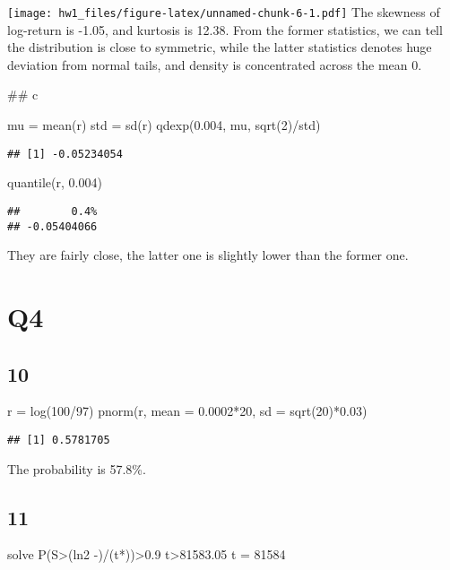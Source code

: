 \documentclass[
]{article}
\newenvironment{Shaded}{\begin{snugshade}}{\end{snugshade}}
\newcommand{\AttributeTok}[1]{\textcolor[rgb]{0.77,0.63,0.00}{#1}}
\newcommand{\DecValTok}[1]{\textcolor[rgb]{0.00,0.00,0.81}{#1}}
\newcommand{\FloatTok}[1]{\textcolor[rgb]{0.00,0.00,0.81}{#1}}
\newcommand{\FunctionTok}[1]{\textcolor[rgb]{0.00,0.00,0.00}{#1}}
\newcommand{\NormalTok}[1]{#1}
\newcommand{\OtherTok}[1]{\textcolor[rgb]{0.56,0.35,0.01}{#1}}
\newcommand{\SpecialCharTok}[1]{\textcolor[rgb]{0.00,0.00,0.00}{#1}}
\begin{document}
\texttt{[image: hw1\_files/figure-latex/unnamed-chunk-6-1.pdf]} The
skewness of log-return is -1.05, and kurtosis is 12.38. From the former
statistics, we can tell the distribution is close to symmetric, while
the latter statistics denotes huge deviation from normal tails, and
density is concentrated across the mean 0.

\#\# c

\begin{Shaded}
\begin{Highlighting}[]
\NormalTok{mu }\OtherTok{=} \FunctionTok{mean}\NormalTok{(r)}
\NormalTok{std }\OtherTok{=} \FunctionTok{sd}\NormalTok{(r)}
\FunctionTok{qdexp}\NormalTok{(}\FloatTok{0.004}\NormalTok{, mu, }\FunctionTok{sqrt}\NormalTok{(}\DecValTok{2}\NormalTok{)}\SpecialCharTok{/}\NormalTok{std)}
\end{Highlighting}
\end{Shaded}

\begin{verbatim}
## [1] -0.05234054
\end{verbatim}

\begin{Shaded}
\begin{Highlighting}[]
\FunctionTok{quantile}\NormalTok{(r, }\FloatTok{0.004}\NormalTok{)}
\end{Highlighting}
\end{Shaded}

\begin{verbatim}
##        0.4% 
## -0.05404066
\end{verbatim}

They are fairly close, the latter one is slightly lower than the former
one.

\hypertarget{q4}{%
\section{Q4}\label{q4}}

\hypertarget{section}{%
\subsection{10}\label{section}}

\begin{Shaded}
\begin{Highlighting}[]
\NormalTok{r }\OtherTok{=} \FunctionTok{log}\NormalTok{(}\DecValTok{100}\SpecialCharTok{/}\DecValTok{97}\NormalTok{)}
\FunctionTok{pnorm}\NormalTok{(r, }\AttributeTok{mean =} \FloatTok{0.0002}\SpecialCharTok{*}\DecValTok{20}\NormalTok{, }\AttributeTok{sd =} \FunctionTok{sqrt}\NormalTok{(}\DecValTok{20}\NormalTok{)}\SpecialCharTok{*}\FloatTok{0.03}\NormalTok{)}
\end{Highlighting}
\end{Shaded}

\begin{verbatim}
## [1] 0.5781705
\end{verbatim}

The probability is 57.8\%.

\hypertarget{section-1}{%
\subsection{11}\label{section-1}}

solve P(S\textgreater(ln2 -\mu)/(t*\sigma))\textgreater0.9
t\textgreater81583.05 t = 81584
\end{document}
